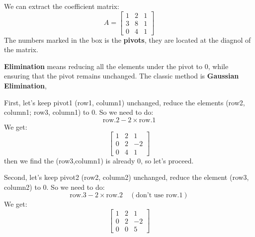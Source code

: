             We can extract the coefficient matrix:
            \begin{equation}
                A = \begin{bmatrix}
                        \boxed{1} & 2 & 1 \\
                        3 & \boxed{8} & 1 \\
                        0 & 4 & \boxed{1}
                    \end{bmatrix}
            \end{equation}
            The numbers marked in the box is the \textbf{pivots}, 
            they are located at the diagnol of the matrix.

            \textbf{Elimination} means reducing all the elements under the pivot to 0,
            while ensuring that the pivot remains unchanged. The classic method is \textbf{Gaussian Elimination}, 

            First, let's keep pivot1 (row1, column1) unchanged, 
            reduce the elements (row2, column1; row3, column1) to 0. 
            So we need to do:
                \begin{equation}
                    \text{row.2} - 2 \times \text{row.1}
                \end{equation}
            We get:
                \begin{equation}
                    \begin{bmatrix}
                        \boxed{1} & 2 & 1 \\
                        0 & \boxed{2} & -2 \\
                        0 & 4 & \boxed{1}
                    \end{bmatrix}
                \end{equation}
            then we find the (row3,column1) is already 0, so let's proceed.

            Second, let's keep pivot2 (row2, column2) unchanged,
            reduce the element (row3, column2) to 0. 
            So we need to do:
                \begin{equation}
                    \text{row.3} - 2 \times \text{row.2}\quad (\text{don't use row.1})
                \end{equation}
            We get:
                \begin{equation}
                    \begin{bmatrix}
                        \boxed{1} & 2 & 1 \\
                        0 & \boxed{2} & -2 \\
                        0 & 0 & \boxed{5}
                    \end{bmatrix}
                \end{equation}

